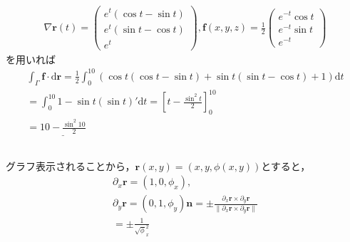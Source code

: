 \documentclass[dvipdfmx]{jsarticle}
\begin{document}
    \subsection{}
      \begin{align*}
        \nabla \bm{r}(t) =
        \begin{pmatrix}
          e^t(\cos t - \sin t)\\
          e^t(\sin t - \cos t)\\
          e^t
        \end{pmatrix}
        , \bm{f}(x, y, z) = \frac{1}{2}
        \begin{pmatrix}
          e^{-t} \cos t\\
          e^{-t} \sin t\\
          e^{-t}
        \end{pmatrix}
      \end{align*}
      を用いれば
      \begin{align*}
        \int_{\Gamma} \bm{f} \cdot \mathrm{d} \bm{r} =\frac{1}{2} \int_{0}^{10} (\cos t (\cos t - \sin t) + \sin t (\sin t - \cos t) + 1) \mathrm{d}t\\
        = \int_{0}^{10} 1 - \sin t (\sin t )' \mathrm{d}t
        = [t - \frac{\sin^2 t}{2}]_{0}^{10}\\
        = \underline{10 - \frac{\sin^2 10}{2}}
      \end{align*}
    \subsection{}
      グラフ表示されることから，$\bm{r}(x, y) = (x, y, \phi(x, y))$とすると，
      \begin{align*}
        \partial_x \bm{r} = (1, 0, \phi_x), \\
        \partial_y \bm{r} = (0, 1, \phi_y)
        \bm{n} = \pm \frac{\partial_x \bm{r} \times \partial_y \bm{r}}{\|\partial_x \bm{r} \times \partial_y \bm{r}\|}\\
        = \pm \frac{1}{\sqrt\phi^2_x}
      \end{align*}
\end{document}

